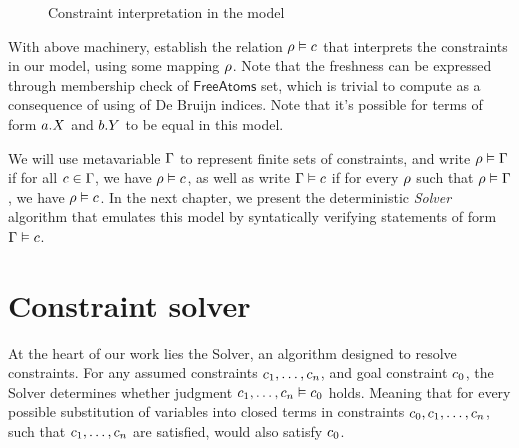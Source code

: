 \documentclass[english, mgr]{iithesis}
\renewcommand{\it}[1]{\textit{#1}}
\begin{document}
\begin{figure}[htbp]
  \centering
  \caption{Constraint interpretation in the model}
  \label{fig:constraint-interpretation}
\end{figure}
With above machinery, establish the relation $\rho \vDash c$
that interprets the constraints in our model, using some mapping $\rho$.
Note that the freshness can be expressed through membership check of $\mathsf{FreeAtoms}$ set,
which is trivial to compute as a consequence of using of De Bruijn indices.
Note that  it's possible for terms of form $a.{X}$ and $b.{Y}$
to be equal in this model.

We will use metavariable $\Gamma$ to represent finite sets of constraints,
and write $\rho \vDash \Gamma$ if for all $c \in \Gamma$,
we have $\rho \vDash c$,
as well as write $\Gamma \vDash c$ if for every $\rho$ such that $\rho \vDash \Gamma$,
we have $\rho \vDash c$.
In the next chapter, we present the deterministic \it{Solver} algorithm
that emulates this model by syntatically verifying statements of form $\Gamma \vDash c$.

\chapter{Constraint solver} \label{sec:solver}
At the heart of our work lies the Solver, an algorithm designed to resolve constraints.
For any assumed constraints $c_1, \dots, c_n$, and
goal constraint $c_0$, the Solver determines whether judgment $c_1, \dots, c_n \vDash c_0$ holds.
Meaning that for every possible substitution of variables into closed terms in constraints $c_0, c_1, \dots, c_n$,
such that $c_1, \dots, c_n$ are satisfied, would also satisfy $c_0$.
\end{document}
